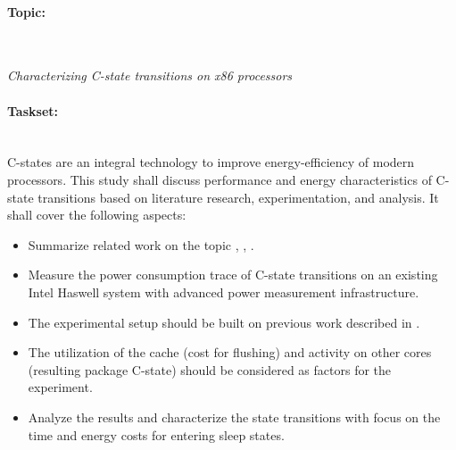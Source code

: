 \paragraph{Topic:} \hfill\\ 
\begin{center}
	     \textit{Characterizing C-state transitions on x86 processors}
	     \end{center}
\paragraph*{Taskset:} \hfill\\
C-states \cite{ACPI2016} are an integral technology to improve energy-efficiency of modern processors.
This study shall discuss performance and energy characteristics of C-state transitions based on literature research, experimentation, and analysis.
It shall cover the following aspects:
\begin{itemize}
\item Summarize related work on the topic \cite{DBLP:journals/ife/SchoneMW15}, \cite{Wamhoff2015}, \cite{ACPI2016}.
\item Measure the power consumption trace of C-state transitions on an existing Intel Haswell system with advanced power measurement infrastructure.
\item The experimental setup should be built on previous work described in \cite{DBLP:journals/ife/SchoneMW15}.
\item The utilization of the cache (cost for flushing) and activity on other cores (resulting package C-state) should be considered as factors for the experiment.
\item Analyze the results and characterize the state transitions with focus on the time and energy costs for entering sleep states.
\end{itemize}


